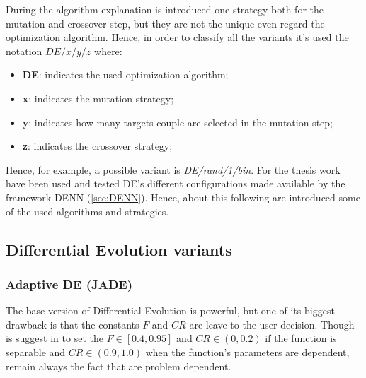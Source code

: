 During the algorithm explanation is introduced one strategy both for the mutation and crossover step, but they are not the unique even regard the optimization algorithm. Hence, in order to classify all the variants it's used the notation $DE/x/y/z$ where:
\begin{itemize}
	\item{\textbf{DE}: indicates the used optimization algorithm;}
	\item{\textbf{x}: indicates the mutation strategy;}
	\item{\textbf{y}: indicates how many targets couple are selected in the mutation step;}
	\item{\textbf{z}: indicates the crossover strategy;}
\end{itemize}
Hence, for example, a possible variant is \textit{DE/rand/1/bin}. For the thesis work have been used and tested DE's different configurations made available by the framework DENN (\ref{sec:DENN}). Hence, about this following are introduced some of the used algorithms and strategies.
\subsection{Differential Evolution variants}
\subsubsection{Adaptive DE (JADE)}
The base version of Differential Evolution is powerful, but one of its biggest drawback is that the constants $F$ and $CR$ are leave to the user decision. Though is suggest in \cite{RPODE:2005} to set the $F\in[0.4, 0.95]$ and $CR \in (0, 0.2)$ if the function is separable and $CR \in (0.9, 1.0)$ when the function's parameters are dependent, remain always the fact that are problem dependent. 

